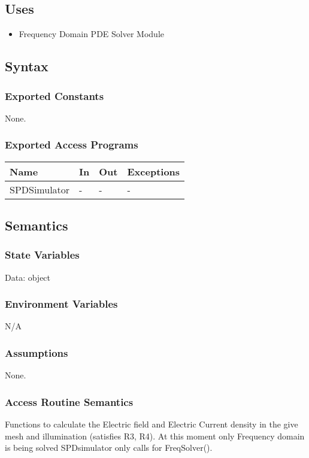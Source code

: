 \documentclass[12pt, titlepage]{article}
\begin{document}
\subsection{Uses}
\begin{itemize}
	\item Frequency Domain PDE Solver Module
\end{itemize}

\subsection{Syntax}

\subsubsection{Exported Constants}
None.
\subsubsection{Exported Access Programs}

\begin{center}
	\begin{tabular}{p{4cm} p{4cm} p{4cm} p{2cm}}
		\hline
		\textbf{Name} & \textbf{In} & \textbf{Out} & \textbf{Exceptions} \\
		\hline
		SPDSimulator & - & - & - \\
		\hline
	\end{tabular}
\end{center}

\subsection{Semantics}

\subsubsection{State Variables}

Data: object

\subsubsection{Environment Variables}
N/A
 
\subsubsection{Assumptions}
None.

\subsubsection{Access Routine Semantics}
Functions to calculate the Electric field and Electric Current
density in the give mesh and illumination (satisfies R3, R4). At this moment only Frequency domain is being solved SPDsimulator only calls for FreqSolver(). 
\end{document}
